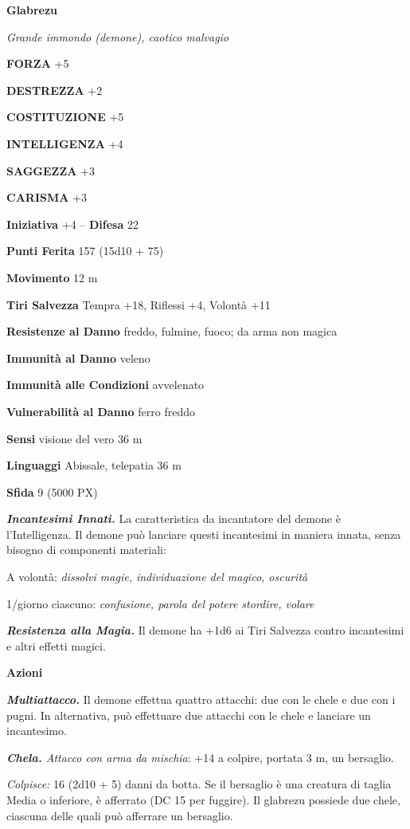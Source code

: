 \begin{multicols}{2}
\medskip{}\textbf{Glabrezu}

\textit{Grande immondo (demone), caotico malvagio}

\textbf{FORZA} +5

\textbf{DESTREZZA} +2

\textbf{COSTITUZIONE} +5

\textbf{INTELLIGENZA} +4

\textbf{SAGGEZZA} +3

\textbf{CARISMA} +3

\textbf{Iniziativa} +4 -- \textbf{Difesa} 22

\textbf{Punti Ferita} 157 (15d10 + 75)

\textbf{Movimento} 12 m

\textbf{Tiri Salvezza} Tempra +18, Riflessi +4, Volontà +11

\textbf{Resistenze al Danno} freddo, fulmine, fuoco; da arma non magica

\textbf{Immunità al Danno} veleno

\textbf{Immunità alle Condizioni} avvelenato

\textbf{Vulnerabilità al Danno} ferro freddo

\textbf{Sensi} visione del vero 36 m

\textbf{Linguaggi} Abissale, telepatia 36 m

\textbf{Sfida} 9 (5000 PX)

\textit{\textbf{Incantesimi Innati.}} La caratteristica da incantatore del demone è l'Intelligenza. Il demone può lanciare questi incantesimi in maniera innata, senza bisogno di componenti materiali:

A volontà: \textit{dissolvi magie, individuazione del magico, oscurità}

1/giorno ciascuno: \textit{confusione, parola del potere stordire, volare}

\textit{\textbf{Resistenza alla Magia.}} Il demone ha +1d6 ai Tiri Salvezza contro incantesimi e altri effetti magici.

\textbf{Azioni}

\textit{\textbf{Multiattacco.}} Il demone effettua quattro attacchi: due con le chele e due con i pugni. In alternativa, può effettuare due attacchi con le chele e lanciare un incantesimo.

\textit{\textbf{Chela.} Attacco con arma da mischia}: +14 a colpire, portata 3 m, un bersaglio.

\textit{Colpisce:} 16 (2d10 + 5) danni da botta. Se il bersaglio è una creatura di taglia Media o inferiore, è afferrato (DC 15 per fuggire). Il glabrezu possiede due chele, ciascuna delle quali può afferrare un bersaglio.


\end{multicols}
